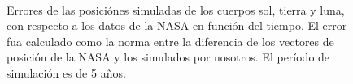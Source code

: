 \begin{figure}
	\centering
	\\
	\caption{
		Errores de las posiciónes simuladas de los cuerpos sol, tierra y luna,
		con respecto a los datos de la NASA en función del tiempo.
		El error fua calculado como la norma entre la diferencia de los
		vectores de posición de la NASA y los simulados por nosotros.
		El período de simulación es de 5 años.
	}
	\label{ fig:res_ej1_err }
\end{figure}
